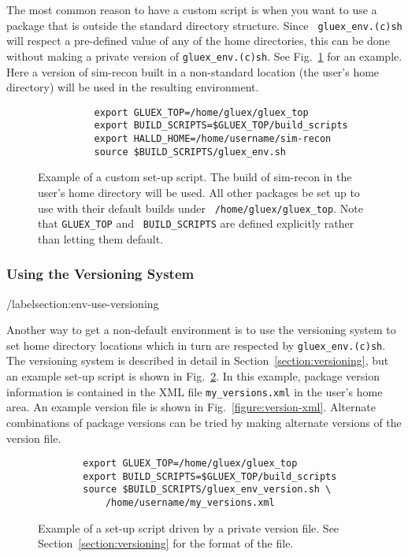 \documentclass[12pt]{article}
\begin{document}
The most common reason to have a custom script is when you want to use
a package that is outside the standard directory structure. Since {\tt
  gluex\_env.(c)sh} will respect a pre-defined value of any of the
home directories, this can be done without making a private version of
{\tt gluex\_env.(c)sh}. See Fig.~\ref{figure:custom-script} for an
example. Here a version of sim-recon built in a non-standard location
(the user's home directory) will be used in the resulting environment.

\begin{figure}
\begin{verbatim}
          export GLUEX_TOP=/home/gluex/gluex_top
          export BUILD_SCRIPTS=$GLUEX_TOP/build_scripts
          export HALLD_HOME=/home/username/sim-recon
          source $BUILD_SCRIPTS/gluex_env.sh
\end{verbatim}
\caption{Example of a custom set-up script. The build of sim-recon in
  the user's home directory will be used. All other packages be set up
  to use with their default builds under {\tt
    /home/gluex/gluex\_top}. Note that {\tt GLUEX\_TOP} and {\tt
  BUILD\_SCRIPTS} are defined explicitly rather than letting them
default.}\label{figure:custom-script}
\end{figure}

\subsubsection{Using the Versioning System}/label{section:env-use-versioning}

Another way to get a non-default environment is to use the versioning
system to set home directory locations which in turn are respected by
{\tt gluex\_env.(c)sh}. The versioning system is described in detail
in Section~\ref{section:versioning}, but an example set-up script is
shown in Fig.~\ref{figure:version-script}. In this example, package version
information is contained in the XML file {\tt my\_versions.xml} in the
user's home area. An example version file is shown in Fig.~\ref{figure:version-xml}. Alternate combinations of package versions can be tried by making alternate versions of the version file.

\begin{figure}
\begin{verbatim}
        export GLUEX_TOP=/home/gluex/gluex_top
        export BUILD_SCRIPTS=$GLUEX_TOP/build_scripts
        source $BUILD_SCRIPTS/gluex_env_version.sh \
            /home/username/my_versions.xml
\end{verbatim}
\caption{Example of a set-up script driven by a private version
  file. See Section~\ref{section:versioning} for the format of the
  file.}\label{figure:version-script}
\end{figure}
\end{document}
